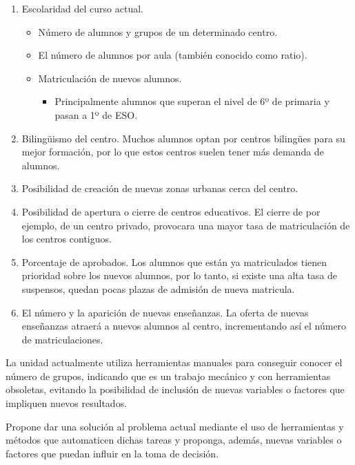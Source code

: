 \begin{enumerate}
\item Escolaridad del curso actual.
\begin{itemize}
\item Número de alumnos y grupos de un determinado centro.
\item El número de alumnos por aula (también conocido como ratio).
\item Matriculación de nuevos alumnos.
\begin{itemize}
\item Principalmente alumnos que superan el nivel de 6º de primaria y pasan a 1º de ESO.
\end{itemize}
\end{itemize}

\item Bilingüismo del centro. Muchos alumnos optan por centros bilingües para su mejor formación, por lo que estos centros suelen tener más demanda de alumnos.
\item Posibilidad de creación de nuevas zonas urbanas cerca del centro. 
\item Posibilidad de apertura o cierre de centros educativos. El cierre de por ejemplo, de un centro privado, provocara una mayor tasa de matriculación de los centros contiguos. 
\item Porcentaje de aprobados. Los alumnos que están ya matriculados tienen prioridad sobre los nuevos alumnos, por lo tanto, si existe una alta tasa de suspensos, quedan pocas plazas de admisión de nueva matricula.
\item El número y la aparición de nuevas enseñanzas. La oferta de nuevas enseñanzas atraerá a nuevos alumnos al centro, incrementando así el número de matriculaciones.
\end{enumerate}

La unidad actualmente utiliza herramientas manuales para conseguir conocer el número de grupos, indicando que es un trabajo mecánico y con herramientas obsoletas, evitando la posibilidad de inclusión de nuevas variables o factores que impliquen nuevos resultados.

Propone dar una solución al problema actual mediante el uso de herramientas y métodos que automaticen dichas tareas y proponga, además, nuevas variables o factores que puedan influir en la toma de decisión. 


 
 
